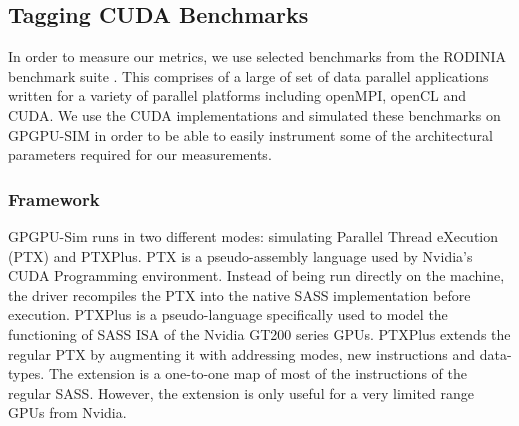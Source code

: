 %
%
\label{sec:our-approach}
\subsection{Tagging CUDA Benchmarks}
	In order to measure our metrics, we use selected benchmarks from the RODINIA benchmark suite \cite{rodinia-benchmark-suite}. This comprises of a large of set of data parallel applications written for a variety of parallel platforms including openMPI, openCL and CUDA. We use the CUDA implementations and simulated these benchmarks on GPGPU-SIM \cite{gpgpu-sim} in order to be able to easily instrument some of the architectural parameters required for our measurements.

	\subsubsection*{Framework}	%
	GPGPU-Sim runs in two different modes: simulating Parallel Thread eXecution (PTX) and PTXPlus. PTX is a pseudo-assembly
language used by Nvidia's CUDA Programming environment. Instead of being run directly on the machine, the driver recompiles the
PTX into the native SASS implementation before execution. 
PTXPlus is a pseudo-language specifically used to model the functioning of SASS ISA of the Nvidia GT200 series GPUs. PTXPlus extends
the regular PTX by augmenting it with addressing modes, new instructions and data-types. The extension is a one-to-one map of most of
 the instructions of the regular SASS. However, the extension is only useful for a very limited range GPUs from Nvidia. 
 
